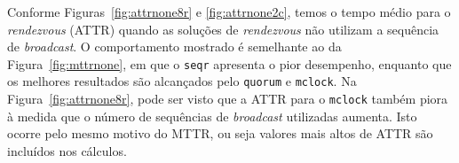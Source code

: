 {%




Conforme Figuras~\ref{fig:attrnone8r} e \ref{fig:attrnone2c}, temos o tempo médio para o {\it rendezvous} (ATTR) quando as soluções de {\it rendezvous} não utilizam a sequência de {\it broadcast}. O comportamento mostrado é semelhante ao da Figura~\ref{fig:mttrnone}, em que o {\tt seqr} apresenta o pior desempenho, enquanto que os melhores resultados são alcançados pelo {\tt quorum} e {\tt mclock}. Na Figura~\ref{fig:attrnone8r}, pode ser visto que a ATTR para o {\tt mclock} também piora à medida que o número de sequências de {\it broadcast} utilizadas aumenta. Isto ocorre pelo mesmo motivo do MTTR, ou seja valores mais altos de ATTR são incluídos nos cálculos.


}
